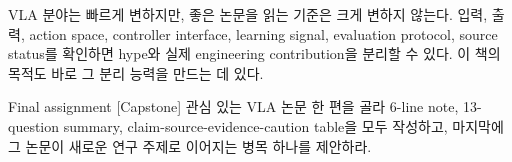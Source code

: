 VLA 분야는 빠르게 변하지만, 좋은 논문을 읽는 기준은 크게 변하지 않는다. 입력, 출력, action space, controller interface, learning signal, evaluation protocol, source status를 확인하면 hype와 실제 engineering contribution을 분리할 수 있다. 이 책의 목적도 바로 그 분리 능력을 만드는 데 있다.

\begin{assignmentbox}{Final assignment [Capstone]}
관심 있는 VLA 논문 한 편을 골라 6-line note, 13-question summary, claim-source-evidence-caution table을 모두 작성하고, 마지막에 그 논문이 새로운 연구 주제로 이어지는 병목 하나를 제안하라.
\end{assignmentbox}
